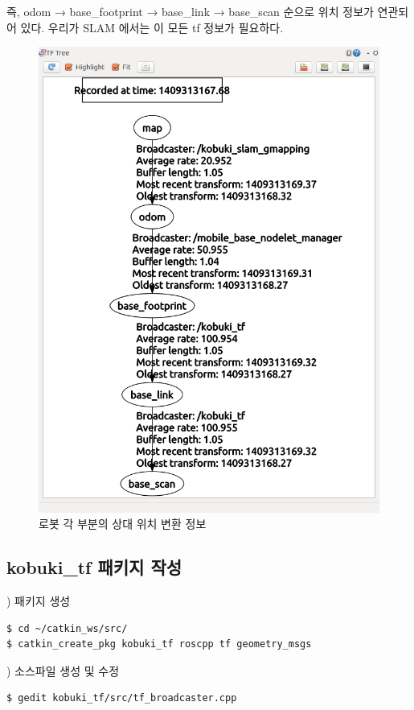 즉, odom → base\_footprint → base\_link → base\_scan 순으로 위치 정보가 연관되어 있다. 우리가 SLAM 에서는 이 모든 tf 정보가 필요하다.

\begin{figure}[h]
\centering
\includegraphics[width=0.6\columnwidth]{pictures/chapter11/slam_tf.png}
\caption{로봇 각 부분의 상대 위치 변환 정보}
\end{figure}

\newpage
\subsection{kobuki\_tf 패키지 작성}

\setcounter{num}{0}

\vspace{\baselineskip}
\noindent
{}
\thenum) 패키지 생성
\begin{lstlisting}[language=ROS]
$ cd ~/catkin_ws/src/
$ catkin_create_pkg kobuki_tf roscpp tf geometry_msgs
\end{lstlisting}


\vspace{\baselineskip}
\noindent
{}
\thenum) 소스파일 생성 및 수정
\begin{lstlisting}[language=ROS]
$ gedit kobuki_tf/src/tf_broadcaster.cpp 
\end{lstlisting}

